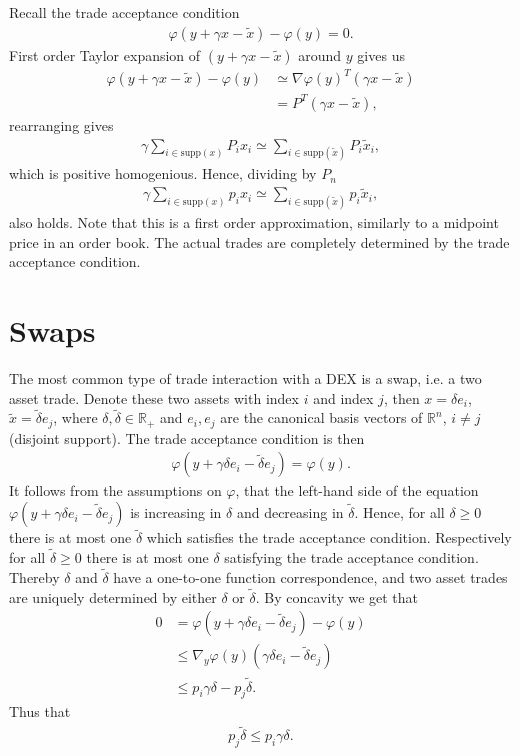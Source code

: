 Recall the trade acceptance condition
\begin{align}
    \varphi(y + \gamma x - \tilde{x}) - \varphi(y) = 0.
\end{align}
First order Taylor expansion of $(y + \gamma x - \tilde{x})$ around $y$ gives us
\begin{align}
    \varphi(y + \gamma x - \tilde{x}) - \varphi(y) &\simeq \nabla
    \varphi(y)^{T} (\gamma x - \tilde{x}) \\
                   &=P^{T} (\gamma x - \tilde{x}),
\end{align}
rearranging gives
\begin{align}
    \gamma \sum_{i \in \text{supp}(x) } P_i x_i \simeq \sum_{i \in
    \text{supp}(\tilde{x}) } P_i \tilde{x}_i,
\end{align}
which is positive homogenious. Hence, dividing by $P_n$
\begin{align}
    \gamma \sum_{i \in \text{supp}(x) } p_i x_i \simeq \sum_{i \in
    \text{supp}(\tilde{x}) } p_i \tilde{x}_i,
\end{align}
also holds.
Note that this is a first order approximation, similarly to a
midpoint price in an order book. The actual trades are completely
determined by the trade acceptance condition.
\section{Swaps}
The most common type of trade interaction with a DEX is a swap, i.e. a two
asset trade. Denote these two assets with index $i$ and index $j$, then
$x=\delta e_i$, $\tilde{x}=\tilde{\delta} e_j$, where $\delta, \tilde{\delta}
\in \mathbb{R}_+$ and $e_i,e_j$ are the canonical basis vectors of
$\mathbb{R}^{n}$, $i \neq j$ (disjoint support). The trade acceptance
condition is then
\begin{align}
    \varphi(y + \gamma\delta e_i - \tilde{\delta}e_j) = \varphi(y).
    \label{eq: trade_acceptance_condition}
\end{align}
It follows from the assumptions on $\varphi$, that the left-hand side of the
equation $\varphi(y + \gamma\delta e_i - \tilde{\delta}e_j)$ is increasing
in $\delta$ and decreasing in $\tilde{\delta}$. Hence, for all $\delta \ge 0$
there is at most one $\tilde{\delta}$ which satisfies the trade acceptance
condition. Respectively for all $\tilde{\delta} \ge 0$ there is at most one
$\delta$ satisfying the trade acceptance condition. Thereby $\delta$ and
$\tilde{\delta}$ have a one-to-one function correspondence, and two asset
trades are uniquely determined by either $\delta$ or $\tilde{\delta}$. By
concavity we get that
\begin{align}
    0 &= \varphi(y+\gamma\delta e_i - \tilde{\delta}e_j) - \varphi(y)\\
      &\le \nabla_y \varphi(y) (\gamma\delta e_i - \tilde{\delta}e_j) \\
      &\le p_i \gamma \delta - p_j \tilde{\delta}.
\end{align}
Thus that
\begin{align}
    p_j \tilde{\delta} \le p_i \gamma \delta.
\end{align}

